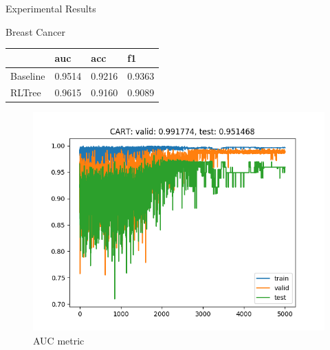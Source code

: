 \documentclass{beamer}
\begin{document}
\begin{frame}{Experimental Results}
	\begin{block}{Breast Cancer}
		\begin{table}[]
			\begin{tabular}{llll}
				\hline
				& auc    & acc    & f1     \\ \hline
				Baseline & 0.9514 & 0.9216 & 0.9363 \\
				RLTree   & 0.9615 & 0.9160 & 0.9089 \\ \hline
			\end{tabular}
		\end{table}
	\end{block}
	\begin{figure}{}
		\includegraphics[scale=0.4]{breast_cancer_auc_sample_curve}
		\caption{AUC metric}
	\end{figure}
\end{frame}
\end{document}
